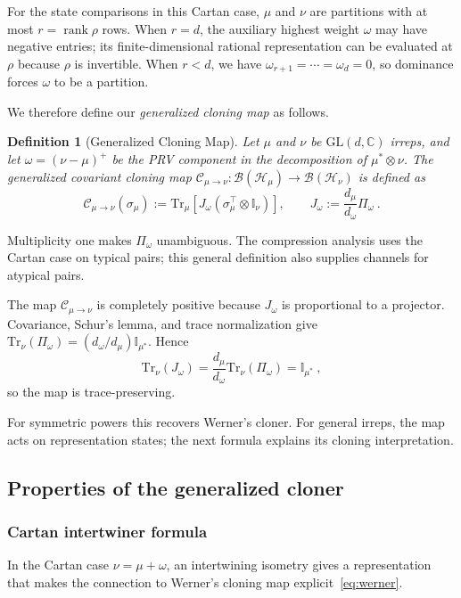\documentclass[a4paper,onecolumn,11pt]{quantumarticle}
\newtheorem{defn}{Definition}
\def\id{\mathbb{I}}
\newcommand*{\Tr}{\mathrm{Tr}}
\begin{document}
For the state comparisons in this Cartan case, $\mu$ and $\nu$ are
partitions with at most $r=\operatorname{rank}\rho$ rows. When $r=d$,
the auxiliary highest weight $\omega$ may have negative entries; its
finite-dimensional rational representation can be evaluated at $\rho$
because $\rho$ is invertible. When $r<d$, we have
$\omega_{r+1}=\cdots=\omega_d=0$, so dominance forces $\omega$ to be
a partition.

We therefore define our \emph{generalized cloning map} as follows.

\begin{defn}[Generalized Cloning Map]
Let $\mu$ and $\nu$ be $\mathrm{GL}(d,\mathbb{C})$ irreps, and let $\omega = (\nu-\mu)^+$ be the PRV component in the decomposition of $\mu^*\otimes\nu$. The generalized covariant cloning map $\mathcal{C}_{\mu\to\nu}:\mathcal B(\mathcal{H}_\mu)\to \mathcal B(\mathcal{H}_\nu)$ is defined as
\begin{equation}\label{eq:gen_cloner}
    \mathcal{C}_{\mu\to\nu}(\sigma_\mu)
    :=\Tr_\mu\!\left[J_\omega
    (\sigma_\mu^\top\otimes\id_\nu)\right],
    \qquad J_\omega:=\frac{d_\mu}{d_\omega}\Pi_\omega\ .
\end{equation}
\end{defn}

Multiplicity one makes $\Pi_\omega$ unambiguous. The compression
analysis uses the Cartan case on typical pairs; this general
definition also supplies channels for atypical pairs.

The map $\mathcal{C}_{\mu\to\nu}$ is completely positive because $J_\omega$ is proportional to a projector. Covariance, Schur's lemma, and trace normalization give $\Tr_\nu(\Pi_\omega)=(d_\omega/d_\mu)\id_{\mu^*}$. Hence
\[
    \Tr_\nu(J_\omega)
    =\frac{d_\mu}{d_\omega}\Tr_\nu(\Pi_\omega)
    =\id_{\mu^*}\ ,
\]
so the map is trace-preserving.

For symmetric powers this recovers Werner's cloner. For general irreps,
the map acts on representation states; the next formula explains its
cloning interpretation.

\subsection{Properties of the generalized cloner}\label{sec:properties}
\subsubsection{Cartan intertwiner formula}
In the Cartan case $\nu=\mu+\omega$, an intertwining isometry gives a representation that makes the connection to Werner's cloning map explicit~\eqref{eq:werner}.
\end{document}
